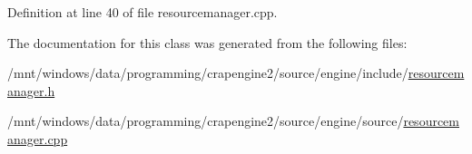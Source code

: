 Definition at line 40 of file resourcemanager.\+cpp.



The documentation for this class was generated from the following files\+:\begin{DoxyCompactItemize}
\item 
/mnt/windows/data/programming/crapengine2/source/engine/include/\hyperlink{resourcemanager_8h}{resourcemanager.\+h}\item 
/mnt/windows/data/programming/crapengine2/source/engine/source/\hyperlink{source_2resourcemanager_8cpp}{resourcemanager.\+cpp}\end{DoxyCompactItemize}
